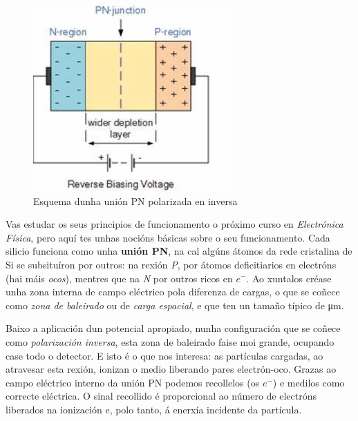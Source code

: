 \documentclass[11pt, a4paper]{article}
\begin{document}
\begin{figure}
    \begin{center}
        \includegraphics[width=0.7\linewidth]{figures/pn_junction.png}
    \end{center}
    \caption{Esquema dunha unión PN polarizada en inversa}
\end{figure}
Vas estudar os seus principios de funcionamento o próximo curso en \textit{Electrónica Física}, pero aquí tes unhas nocións básicas sobre o seu funcionamento. Cada silicio funciona como unha \textbf{unión PN}, na cal algúns átomos da rede cristalina de Si se subsituíron por outros: na rexión \textit{P}, por átomos deficitiarios en electróns (hai máis \textit{ocos}), mentres que na \textit{N} por outros ricos en $e^-$. Ao xuntalos créase unha zona interna de campo eléctrico pola diferenza de cargas, o que se coñece como \textit{zona de baleirado} ou de \textit{carga espacial}, e que ten un tamaño típico de \unit{\micro\m}.

Baixo a aplicación dun potencial apropiado, nunha configuración que se coñece como \textit{polarización inversa}, esta zona de baleirado faise moi grande, ocupando case todo o detector. E isto é o que nos interesa: as partículas cargadas, ao atravesar esta rexión, ionizan o medio liberando pares electrón-oco. Grazas ao campo eléctrico interno da unión PN podemos recollelos (os $e^-$) e medilos como correcte eléctrica. O sinal recollido é proporcional ao número de electróns liberados na ionización e, polo tanto, á enerxía incidente da partícula.
\end{document}
